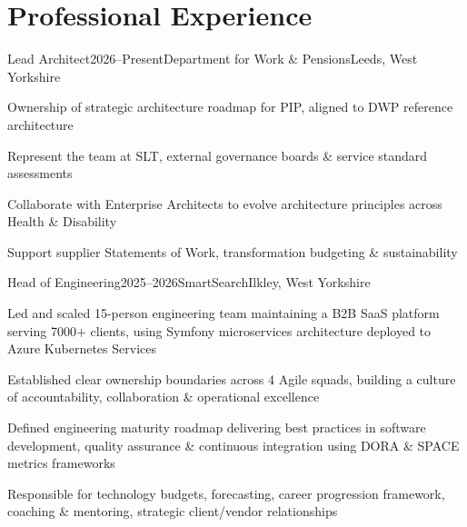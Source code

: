 \documentclass{cv}
\begin{document}
\section{Professional Experience}

\begin{experience}{Lead Architect}{2026--Present}{Department for Work \& Pensions}{Leeds, West Yorkshire}
\item Ownership of strategic architecture roadmap for PIP, aligned to DWP reference architecture
\item Represent the team at SLT, external governance boards \& service standard assessments
\item Collaborate with Enterprise Architects to evolve architecture principles across Health
      \& Disability
\item Support supplier Statements of Work, transformation budgeting \& sustainability
\end{experience}

\begin{experience}{Head of Engineering}{2025--2026}{SmartSearch}{Ilkley, West Yorkshire}
\item Led and scaled 15-person engineering team maintaining a B2B SaaS platform serving 7000+
      clients, using Symfony microservices architecture deployed to Azure Kubernetes Services
\item Established clear ownership boundaries across 4 Agile squads, building a culture of
      accountability, collaboration \& operational excellence
\item Defined engineering maturity roadmap delivering best practices in software development,
      quality assurance \& continuous integration using DORA \& SPACE metrics frameworks
\item Responsible for technology budgets, forecasting, career progression framework, coaching \&
      mentoring, strategic client/vendor relationships
\end{experience}
\end{document}
